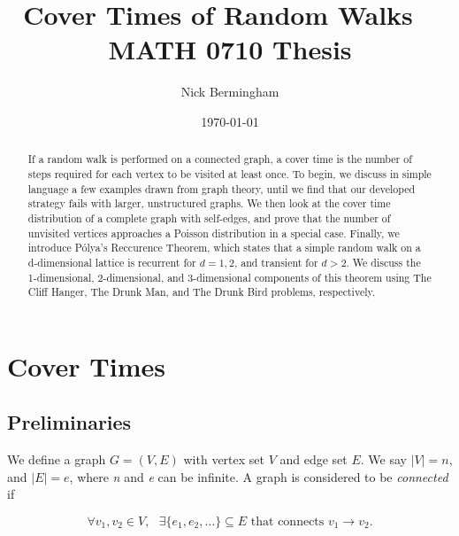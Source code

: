 \documentclass[11pt]{article}
\begin{document}
\setlength{\abovedisplayskip}{0pt}
\setlength{\belowdisplayskip}{5pt}
\setlength{\abovedisplayshortskip}{0pt}
\setlength{\belowdisplayshortskip}{12pt}

\title{{\bf{Cover Times of Random Walks}} 
~ \\
  MATH 0710 Thesis}   

\author{Nick Bermingham}
\date{\today}

\maketitle

\begin{abstract}
If a random walk is performed on a connected graph, a cover time is the number of steps required for each vertex to be visited at least once. To begin, we discuss in simple language a few examples drawn from graph theory, until we find that our developed strategy fails with larger, unstructured graphs. We then look at the cover time distribution of a complete graph with self-edges, and prove that the number of unvisited vertices approaches a Poisson distribution in a special case. Finally, we introduce Pólya's Reccurence Theorem, which states that a simple random walk on a d-dimensional lattice is recurrent for $d = 1, 2$, and transient for $d > 2$. We discuss the 1-dimensional, 2-dimensional, and 3-dimensional components of this theorem using The Cliff Hanger, The Drunk Man, and The Drunk Bird problems, respectively.
\end{abstract}

\newpage

\tableofcontents
\newpage
%
\section{Cover Times}
\subsection{Preliminaries}

\indent \indent We define a graph $G = (V, E)$ with vertex set $V$ and edge set $E$.  We say $\vert V \vert  = n$, and $\vert E \vert  = e$, where \textit{n} and \textit{e} can be infinite. A graph is considered to be \textit{connected} if

\begin{equation}
\forall  v_{1}, v_{2} \in V,\text{ } \exists \{e_{1}, e_{2}, \ldots \} \subseteq E \text{ that connects } v_{1} \to v_{2}.
\end{equation}
\end{document}
